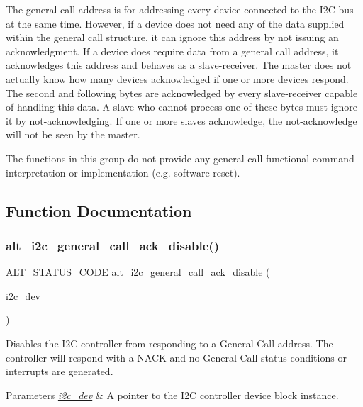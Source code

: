 The general call address is for addressing every device connected to the I2C bus at the same time. However, if a device does not need any of the data supplied within the general call structure, it can ignore this address by not issuing an acknowledgment. If a device does require data from a general call address, it acknowledges this address and behaves as a slave-\/receiver. The master does not actually know how many devices acknowledged if one or more devices respond. The second and following bytes are acknowledged by every slave-\/receiver capable of handling this data. A slave who cannot process one of these bytes must ignore it by not-\/acknowledging. If one or more slaves acknowledge, the not-\/acknowledge will not be seen by the master.

The functions in this group do not provide any general call functional command interpretation or implementation (e.\+g. software reset). 

\subsection{Function Documentation}
\mbox{\label{group__ALT__I2C__GEN__CALL_gab82cad6cc438695db0f5c68e3447c422}} 
\subsubsection{\texorpdfstring{alt\_i2c\_general\_call\_ack\_disable()}{alt\_i2c\_general\_call\_ack\_disable()}}
{\footnotesize\ttfamily \mbox{\hyperlink{hwlib_8h_abdb0d369f069723ca55d6c94bcaaaa12}{A\+L\+T\+\_\+\+S\+T\+A\+T\+U\+S\+\_\+\+C\+O\+DE}} alt\+\_\+i2c\+\_\+general\+\_\+call\+\_\+ack\+\_\+disable (\begin{DoxyParamCaption}\item[{\mbox{\hyperlink{structALT__I2C__DEV__s}{A\+L\+T\+\_\+\+I2\+C\+\_\+\+D\+E\+V\+\_\+t}} $\ast$}]{i2c\+\_\+dev }\end{DoxyParamCaption})}

Disables the I2C controller from responding to a General Call address. The controller will respond with a N\+A\+CK and no General Call status conditions or interrupts are generated.


\begin{DoxyParams}{Parameters}
{\em \mbox{\hyperlink{structi2c__dev}{i2c\+\_\+dev}}} & A pointer to the I2C controller device block instance.\\
\hline
\end{DoxyParams}

